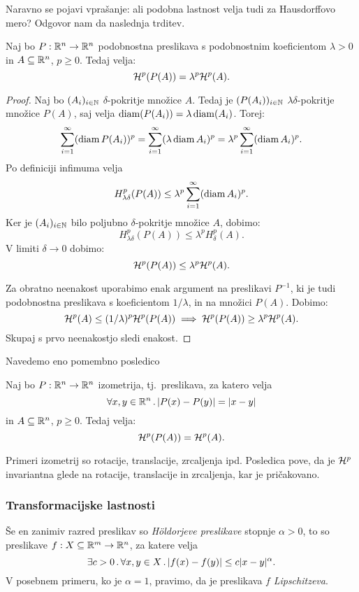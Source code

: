 Naravno se pojavi vprašanje: ali podobna lastnost velja tudi za Hausdorffovo mero? Odgovor nam da naslednja trditev.

\begin{trditev}
    \label{skale}
    Naj bo \(P: \mathbb{R}^n \to \mathbb{R}^n\) podobnostna preslikava s podobnostnim koeficientom \(\lambda > 0\) in \(A \subseteq \mathbb{R}^n\), \(p \geq 0\). Tedaj velja:
    \[\mathcal{H}^p(P(A)) = \lambda^p \mathcal{H}^p(A).\]
\end{trditev}

\begin{proof}
    Naj bo \((A_i)_{i \in \mathbb{N}}\) \(\delta\)-pokritje množice \(A\). Tedaj je \((P(A_i))_{i \in \mathbb{N}}\) \(\lambda \delta\)-pokritje množice \(P(A)\), saj velja \(\operatorname{diam}(P(A_i)) = \lambda \operatorname{diam}(A_i)\). Torej:
    \[\sum_{i=1}^{\infty} (\operatorname{diam} P(A_i))^p = \sum_{i=1}^{\infty}(\lambda \operatorname{diam} A_i)^p = \lambda^p \sum_{i=1}^{\infty}(\operatorname{diam} A_i)^p.\]
    Po definiciji infimuma velja 
    \[H^p_{\lambda \delta} (P(A)) \leq \lambda^p \sum_{i=1}^{\infty}(\operatorname{diam} A_i)^p.\]
    Ker je \((A_i)_{i \in \mathbb{N}}\) bilo poljubno \(\delta\)-pokritje množice \(A\), dobimo:
    \[H^p_{\lambda \delta} (P(A)) \leq \lambda^p H^p_\delta(A).\]
    V limiti \(\delta \to 0\) dobimo:
    \[\mathcal{H}^p (P(A)) \leq \lambda^p \mathcal{H}^p(A).\]    
    
    Za obratno neenakost uporabimo enak argument na preslikavi \(P^{-1}\), ki je tudi podobnostna preslikava s koeficientom \(1/\lambda\), in na množici \(P(A)\). Dobimo:
    \[
        \mathcal{H}^p(A) \leq (1/\lambda)^p \mathcal{H}^p(P(A)) \implies \mathcal{H}^p(P(A)) \geq \lambda^p \mathcal{H}^p(A).
    \]
    Skupaj s prvo neenakostjo sledi enakost.
\end{proof}

Navedemo eno pomembno posledico

\begin{posledica}
    Naj bo \(P: \mathbb{R}^n \to \mathbb{R}^n\) izometrija, tj.\ preslikava, za katero velja
    \[\forall x, y \in \mathbb{R}^n \,.\, |P(x) - P(y)| = |x - y|\]
    in \(A \subseteq \mathbb{R}^n\), \(p \geq 0\). Tedaj velja:
    \[\mathcal{H}^p(P(A)) = \mathcal{H}^p(A).\]    
\end{posledica}

\noindent Primeri izometrij so rotacije, translacije, zrcaljenja ipd. Posledica pove, da je \(\mathcal{H}^p\) invariantna glede na rotacije, translacije in zrcaljenja, kar je pričakovano.

\subsubsection{Transformacijske lastnosti}
Še en zanimiv razred preslikav so \emph{H\"oldorjeve preslikave} stopnje \(\alpha > 0\), to so preslikave \(f: X \subseteq \mathbb{R}^m \to \mathbb{R}^n\), za katere velja
\[\exists c > 0 \,.\, \forall x, y \in X \,.\, |f(x) - f(y)| \leq c|x-y|^\alpha.\]
V posebnem primeru, ko je \(\alpha = 1\), pravimo, da je preslikava \(f\) \emph{Lipschitzeva}.

